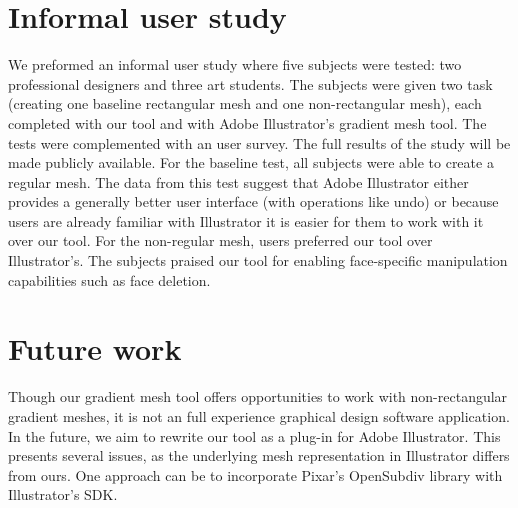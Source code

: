 \documentclass{egpubl}
\newcommand{\note}[3]{{\color{#2}\textbf{#1: #3}}}
\newcommand{\john}[1]{\note{JohnKa}{RubineRed}{#1}}
\begin{document}
	\section{Informal user study}
	\label{sec:results}
	
	
	
	We preformed an informal user study where five subjects were tested: two professional designers and three art students. The subjects were given two task (creating one baseline rectangular mesh and one non-rectangular mesh), each completed with our tool and with Adobe Illustrator's gradient mesh tool. The tests were complemented with an user survey. The full results of the study will be made publicly available. For the baseline test, all subjects were able to create a regular mesh. The data from this test suggest that Adobe Illustrator either provides a generally better user interface (with operations like undo) or because users are already familiar with Illustrator it is easier for them to work with it over our tool. For the non-regular mesh, users preferred our tool over Illustrator's. The subjects praised our tool for enabling face-specific manipulation capabilities such as face deletion.
	
	\section{Future work}
	\label{sec:FW}
	
	Though our gradient mesh tool offers opportunities to work with non-rectangular gradient meshes, it is not an full experience graphical design software application. In the future, we aim to rewrite our tool as a plug-in for Adobe Illustrator. This presents several issues, as the underlying mesh representation in Illustrator differs from ours. One approach can be to incorporate Pixar's OpenSubdiv library with Illustrator's SDK.
	
	
	
	
	
\end{document}
